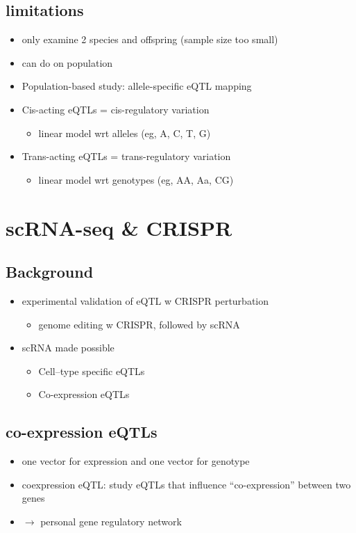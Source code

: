 \documentclass[font=12pt]{article}
\begin{document}
\subsection{limitations}
\begin{itemize}
	\item only examine 2 species and offspring (sample size too small)
	\item can do on population
	\item Population-based study: allele-specific eQTL mapping
	\item Cis-acting eQTLs = cis-regulatory variation
	\begin{itemize}
		\item linear model wrt alleles (eg, A, C, T, G)
	\end{itemize}
	\item Trans-acting eQTLs = trans-regulatory variation
	\begin{itemize}
		\item linear model wrt genotypes (eg, AA, Aa, CG)
	\end{itemize}
\end{itemize}
\newpage
\section{scRNA-seq \& CRISPR}
\subsection{Background}
\begin{itemize}
	\item experimental validation of eQTL w CRISPR perturbation
	\begin{itemize}
		\item genome editing w CRISPR, followed by scRNA
	\end{itemize}
	\item scRNA made possible
	\begin{itemize}
		\item Cell–type specific eQTLs
		\item  Co-expression eQTLs
	\end{itemize}
\end{itemize}

\subsection{co-expression eQTLs}
\begin{itemize}
	\item one vector for expression and one vector for genotype
	\item coexpression eQTL: study eQTLs that influence “co-expression” between two genes
	\item $\to$ personal gene regulatory network
\end{itemize}
\end{document}
